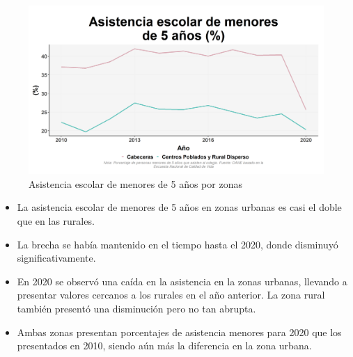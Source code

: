     \begin{figure}[H]
        \caption{Asistencia escolar de menores de 5 años por zonas \label{map_result_2} }
        \begin{center}
        \includegraphics[width=\textwidth,keepaspectratio]{img/var_100_trend.png}
        \end{center}
    \end{figure}
            \begin{itemize}
                \item La asistencia escolar de menores de 5 años en zonas urbanas es casi el doble que en las rurales.
                \item La brecha se había mantenido en el tiempo hasta el 2020, donde disminuyó significativamente.
                \item En 2020 se observó una caída en la asistencia en la zonas urbanas, llevando a presentar valores cercanos a los rurales en el año anterior. La zona rural también presentó una disminución pero no tan abrupta.
                \item Ambas zonas presentan porcentajes de asistencia menores para 2020 que los presentados en 2010, siendo aún más la diferencia en la zona urbana.
                \end{itemize}

